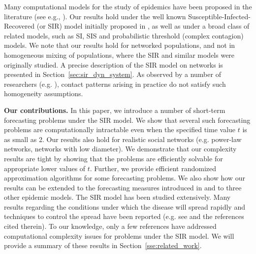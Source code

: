 Many computational models for the study of
epidemics have been proposed in the literature (see e.g., 
\cite{Brauer-2008,marathe:cacm13,Britton-2009,kermack+m:SIR,epi-Bailey,
epi-Hethcote}).
Our results hold under the well known
Susceptible-Infected-Recovered (or SIR) model 
initially proposed in \cite{kermack+m:SIR}, 
as well as under a broad class of 
related models, such as SI, SIS and probabilistic threshold 
(complex contagion) models. 
We note that our results hold for networked populations, and not
in homogeneous mixing of populations, where the SIR and similar
models were originally studied.
A precise description of the SIR model on networks is
presented in Section~\ref{sec:sir_dyn_system}.
As observed by a number of researchers 
(e.g. \cite{marathe:cacm13,SD-2012,Bansal_etal_2007,eubank:nature04,
newman:spread02,Cauchemez15022011}), contact patterns arising
in practice do not satisfy such homogeneity assumptions.

\medskip

\noindent
\textbf{Our contributions.}
In this paper, we introduce a number of short-term forecasting
problems under the SIR model. 
We show that several such forecasting problems are computationally
intractable even when the specified time value $t$ is as small as 2.
Our results also hold for realistic social networks
(e.g. power-law networks, networks with low diameter).
We demonstrate that our complexity results are tight by 
showing that the problems
are efficiently solvable for appropriate lower values of $t$.
Further, we provide efficient randomized approximation 
algorithms for some forecasting problems.
We also show how our results can be extended to the 
forecasting measures introduced in \cite{TC+2016} and to
three other epidemic models.  
The SIR model has been studied extensively. Many results
regarding the conditions under which the disease will spread rapidly and
techniques to control the spread have been reported (e.g. 
see \cite{epi-Hethcote,Britton-2009,Brauer-2008,marathe:cacm13} and the
references cited therein).
To our knowledge, only a few references have addressed 
computational complexity issues for problems under the SIR model.
We will provide a summary of these results in Section~\ref{sse:related_work}.


